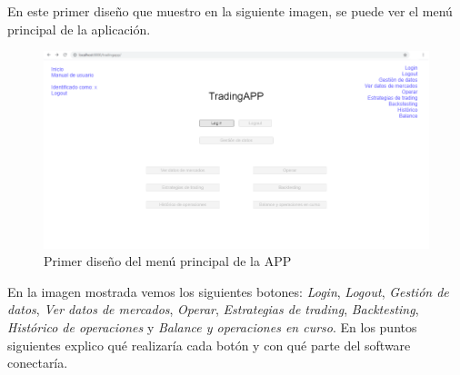 En este primer diseño que muestro en la siguiente imagen, se puede ver el menú principal de la aplicación.\newline

\begin{figure}[h] 
	\includegraphics[width=1.2\textwidth]{imagenes/menu_principal.png}
	\caption{Primer diseño del menú principal de la APP} \label{menu_principal}
\end{figure}

En la imagen mostrada vemos los siguientes botones: \textit{Login}, \textit{Logout}, \textit{Gestión de datos}, \textit{Ver datos de mercados}, \textit{Operar}, \textit{Estrategias de trading}, \textit{Backtesting}, \textit{Histórico de operaciones} y \textit{Balance y operaciones en curso}. En los puntos siguientes explico qué realizaría cada botón y con qué parte del software conectaría.\newline

